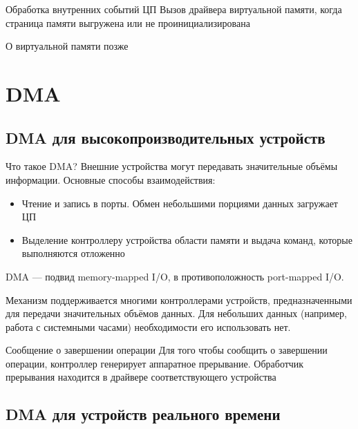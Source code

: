 \documentclass[xetex,aspectratio=43]{beamer}
\begin{document}
\begin{frame}{Обработка внутренних событий ЦП}
	Вызов драйвера виртуальной памяти, когда страница памяти выгружена или
	не проинициализирована

	\pause

	О виртуальной памяти позже
\end{frame}

\section{DMA}

\subsection{DMA для высокопроизводительных устройств}

\begin{frame}{Что такое DMA?}
	Внешние устройства могут передавать значительные объёмы информации.
	Основные способы взаимодействия:

	\begin{itemize}
		\tightlist
		\item
		Чтение и запись в порты. Обмен небольшими порциями данных загружает ЦП
		\item
		Выделение контроллеру устройства области памяти и выдача команд,
		которые выполняются отложенно
	\end{itemize}

	\pause


    DMA --- подвид memory-mapped I/O, в противоположность port-mapped I/O.

	Механизм поддерживается многими контроллерами устройств,
	предназначенными для передачи значительных объёмов данных. Для небольших данных (например, работа с системными часами) необходимости его использовать нет.
\end{frame}

\begin{frame}{Сообщение о завершении операции}
	Для того чтобы сообщить о завершении операции, контроллер генерирует
	аппаратное прерывание. Обработчик прерывания находится в драйвере
	соответствующего устройства
\end{frame}

\subsection{DMA для устройств реального времени}
\end{document}
